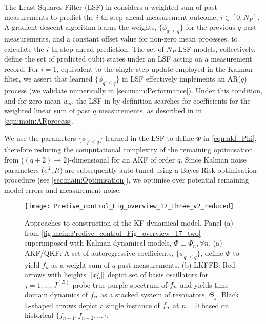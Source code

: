 The Least Squares Filter (LSF) in \cite{mavadia2017} considers a weighted sum of past measurements to predict the $i$-th step ahead measurement outcome, $i \in [0, N_P]$. A gradient descent algorithm learns the weights, $\{\phi_{q' \leq q}\}$ for the previous $q$ past measurements, and a constant offset value for non-zero mean processes, to calculate the $i$-th step ahead prediction. The set of $N_P$ LSF models, collectively, define the set of predicted qubit states under an LSF acting on a measurement record.  For $i=1$, equivalent to the single-step update employed in the Kalman filter, we assert that learned $\{\phi_{q' \leq q}\}$ in LSF effectively implements an AR($q$) process (we validate numerically in \cref{sec:main:Performance}). Under this condition, and for zero-mean $w_n$, the LSF in \cite{mavadia2017} by definition searches for coefficients for the weighted linear sum of past $q$ measurements, as described in in \cref{eqn:main:ARprocess}. 

We use the parameters $\{\phi_{q' \leq q}\}$ learned in the LSF to define $\Phi$ in \cref{eqn:akf_Phi}, therefore reducing the computational complexity of the remaining optimisation from ($(q+2)\to 2$)-dimensional for an AKF of order $q$. Since Kalman noise parameters ($\sigma^2, R$) are subsequently auto-tuned using a Bayes Risk optimisation procedure (see \cref{sec:main:Optimisation}), we optimise over potential remaining model errors and measurement noise.  

\begin{figure} [tp]
    \texttt{[image: Predive\_control\_Fig\_overview\_17\_three\_v2\_reduced]}
    \caption{\label{Predive_control_Fig_overview_17_three} Approaches to construction of the KF dynamical model.  Panel (a) from \cref{fig:main:Predive_control_Fig_overview_17_two} superimposed with Kalman dynamical models, $\Phi \equiv \Phi_n, \forall n$.  (a) AKF/QKF: A set of autoregressive coefficients, $\{\phi_{q'\leq q}\}$, define $\Phi$ to yield $f_n$ as a weight sum of $q$ past measurements. (b) LKFFB: Red arrows with heights $||x^j_n||$ depict set of basis oscillators for $j = 1, \hdots, J^{(B)}$ probe true purple spectrum of $f_n$ and yields time domain dynamics of $f_n$ as a stacked system of resonators, $\Theta_j$. Black L-shaped arrows depict a single instance of $f_n$ at $n=0$ based on historical $\{f_{n-1}, f_{n-2}, \hdots\} $.} 	
\end{figure}

